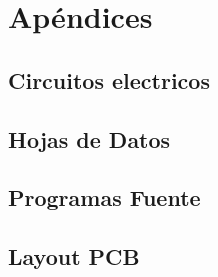 \section{Apéndices}
\label{sec:apendix}

\subsection{Circuitos electricos}
\label{sec:9_circ}


\subsection{Hojas de Datos}
\label{sec:10_hd}

\subsection{Programas Fuente}
\label{sec:11_soft}

\subsection{Layout PCB}
\label{sec:12_pcblay}
